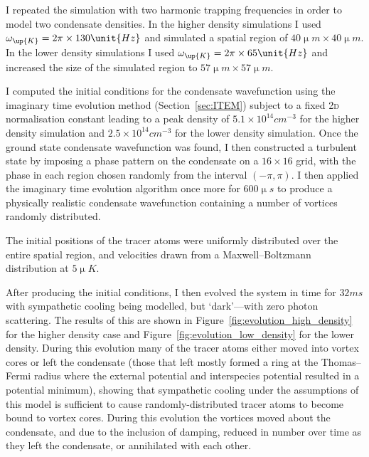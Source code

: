 I repeated the simulation with two harmonic trapping frequencies in order to model two condensate densities. In the higher density simulations I used $\omega_\up{K}=2\pi\times 130\unit{Hz}$ and simulated a spatial region of $40\unit{\upmu m}\times40\unit{\upmu m}$. In the lower density simulations I used $\omega_\up{K}=2\pi\times 65\unit{Hz}$ and increased the size of the simulated region to $57\unit{\upmu m}\times57\unit{\upmu m}$.

I computed the initial conditions for the condensate wavefunction using the imaginary time evolution method (Section~\ref{sec:ITEM}) subject to a fixed \textsc{2d} normalisation constant leading to a peak density of $5.1\times 10^{14}\unit{cm}^{-3}$ for the higher density simulation and $2.5\times 10^{14}\unit{cm}^{-3}$ for the lower density simulation. Once the ground state condensate wavefunction was found, I then constructed a turbulent state by imposing a phase pattern on the condensate on a $16\times16$ grid, with the phase in each region chosen randomly from the interval $(-\pi, \pi)$. I then applied the imaginary time evolution algorithm once more for $600\unit{\upmu s}$ to produce a physically realistic condensate wavefunction containing a number of vortices randomly distributed.

The initial positions of the tracer atoms were uniformly distributed over the entire spatial region, and velocities drawn from a Maxwell--Boltzmann distribution at $5\unit{\upmu K}$.

After producing the initial conditions, I then evolved the system in time for $32\unit{ms}$ with sympathetic cooling being modelled, but `dark'---with zero photon scattering. The results of this are shown in Figure~\ref{fig:evolution_high_density} for the higher density case and Figure~\ref{fig:evolution_low_density} for the lower density. During this evolution many of the tracer atoms either moved into vortex cores or left the condensate (those that left mostly formed a ring at the Thomas--Fermi radius where the external potential and interspecies potential resulted in a potential minimum), showing that sympathetic cooling under the assumptions of this model is sufficient to cause randomly-distributed tracer atoms to become bound to vortex cores. During this evolution the vortices moved about the condensate, and due to the inclusion of damping, reduced in number over time as they left the condensate, or annihilated with each other.

